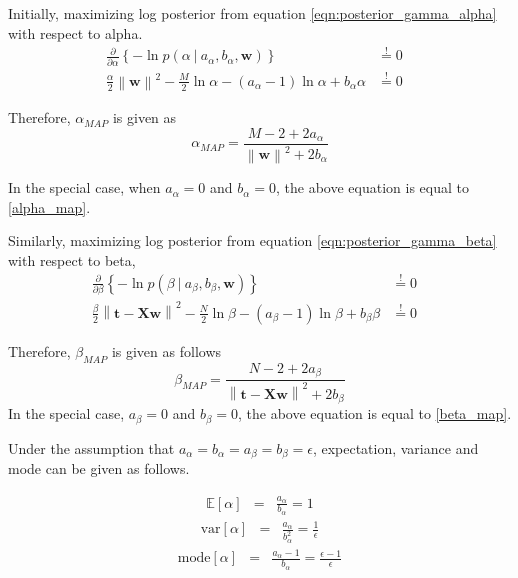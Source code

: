 \documentclass[11pt]{article}
\newcommand{\mean}[1]{\mathbb{E}\left[#1\right]}
\newcommand\given[1][]{\:#1\vert\:}
\newcommand{\norm}[1]{\left\lVert#1\right\rVert}
\begin{document}
Initially, maximizing log posterior from equation \ref{eqn:posterior_gamma_alpha} with respect to alpha.
\begin{eqnarray}
    \frac{\partial }{\partial  \alpha} \left\{ -\ln{p(\alpha \given a_{\alpha}, b_{\alpha}, \bm{w})} \right\}
    &\overset{!}{=} 0&  \\
    \frac{\alpha}{2}\norm{\bm{w}}^2 - \frac{M}{2}\ln{\alpha} - \left( a_{\alpha} - 1 \right)\ln{\alpha} + b_{\alpha}\alpha
    &\overset{!}{=} 0&
\end{eqnarray}

Therefore, $\alpha_{MAP}$ is given as 
\begin{equation} \label{eqn:alpha_map_gamma}
    \alpha_{MAP} = \frac{M-2 + 2a_{\alpha}}{\norm{\bm{w}}^2+2b_{\alpha}}
\end{equation}

In the special case, when $a_{\alpha} = 0$ and $b_{\alpha} = 0$, the above equation is equal to \ref{alpha_map}.

Similarly, maximizing log posterior from equation \ref{eqn:posterior_gamma_beta} with respect to beta,
\begin{eqnarray}
    \frac{\partial }{\partial  \beta} \left\{ -\ln{p(\beta \given a_{\beta}, b_{\beta}, \bm{w})} \right\}
    &\overset{!}{=} 0&  \\
    \frac{\beta}{2}\norm{\bm{t}-\bm{X}\bm{w}}^2 - \frac{N}{2}\ln{\beta} - \left( a_{\beta} - 1 \right)\ln{\beta} + b_{\beta}\beta
    &\overset{!}{=} 0&
\end{eqnarray}

Therefore, $\beta_{MAP}$ is given as follows
\begin{equation}
    \beta_{MAP} = \frac{N-2 + 2a_{\beta}}{\norm{\bm{t}-\bm{X}\bm{w}}^2+2b_{\beta}}
\end{equation}
In the special case, $a_{\beta} = 0$ and $b_{\beta} = 0$, the above equation is equal to \ref{beta_map}.

Under the assumption that $a_{\alpha} = b_{\alpha} = a_{\beta} = b_{\beta} = \epsilon$, expectation, variance and mode can be given as follows.

\begin{eqnarray}
    \mean{\alpha}
    &=& \frac{a_{\alpha}}{b_{\alpha}} = 1
\end{eqnarray}
\begin{eqnarray}
    \text{var} \left[\alpha\right]
    &=& \frac{a_{\alpha}}{b_{\alpha}^2} = \frac{1}{\epsilon}
\end{eqnarray}
\begin{eqnarray}
    \text{mode}\left[\alpha\right] &=& \frac{a_{\alpha}-1}{b_{\alpha}} = \frac{\epsilon-1}{\epsilon}
\end{eqnarray}
\end{document}
